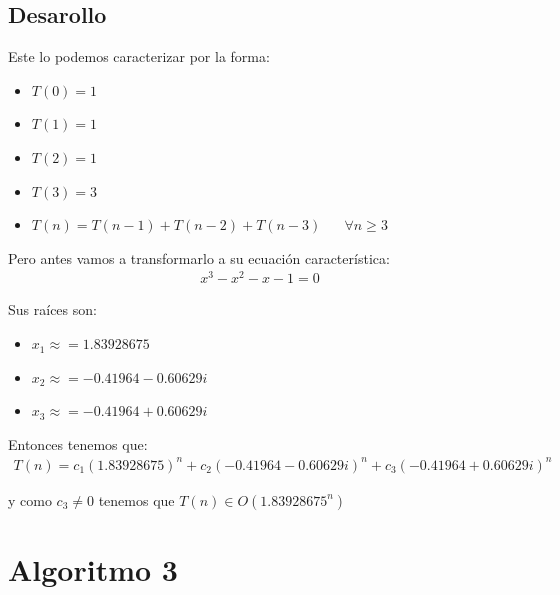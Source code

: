 \documentclass[12pt, fleqn]{article}                            %
\DeclareMathOperator \Space {\quad}                             %
\theoremstyle{break}                                            %
\begin{document}
    \subsection{Desarollo}

        Este lo podemos caracterizar por la forma:
        \begin{itemize}
            \item $T(0) = 1$
            \item $T(1) = 1$
            \item $T(2) = 1$
            \item $T(3) = 3$
            \item $T(n) = T(n - 1) + T(n - 2) + T(n -  3) \Space \forall n \geq 3$
        \end{itemize}

        Pero antes vamos a transformarlo a su ecuación característica:
        \begin{align*}
            x^3 - x^2 - x - 1 = 0 
        \end{align*}

        Sus raíces son:
        \begin{itemize}
            \item $x_1 \approx = 1.83928675$
            \item $x_2 \approx = -0.41964 - 0.60629i$
            \item $x_3 \approx = -0.41964 + 0.60629i$
        \end{itemize}

        Entonces tenemos que:
        \begin{align*}
            T(n) = c_1(1.83928675)^n + c_2(-0.41964 - 0.60629i)^n + c_3(-0.41964 + 0.60629i)^n
        \end{align*}

        y como $c_3 \neq 0$ tenemos que $T(n) \in O(1.83928675^n)$




\clearpage
\section{Algoritmo 3}


\end{document}
